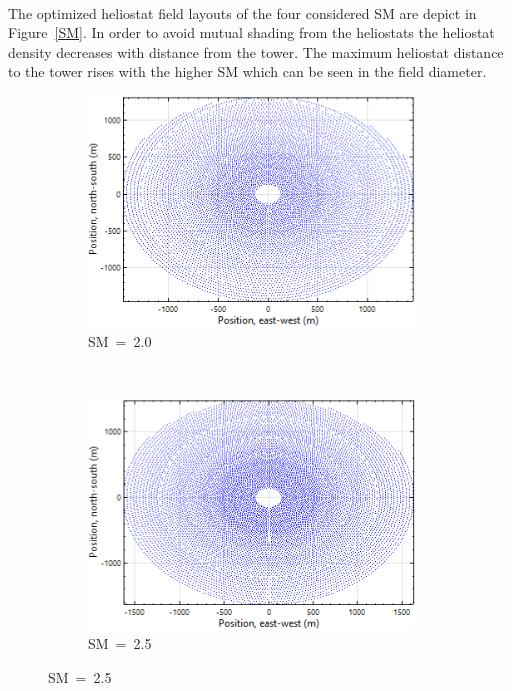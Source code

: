 \documentclass[Master,MEE,english]{twbook}%
\begin{document}
\\
The optimized heliostat field layouts of the four considered SM are depict in Figure~\ref{SM}. In order to avoid mutual shading from the heliostats the heliostat density decreases with distance from the tower. The maximum heliostat distance to the tower rises with the higher SM which can be seen in the field diameter. 
\begin{figure}[!htbp]
        \centering   
        \begin{subfigure}[b]{0.5\textwidth}
                \centering
                \includegraphics[width=0.95\textwidth]{FIG/SM20}
                \caption{SM~=~2.0}\label{SM2.0}
        \end{subfigure}%
        ~
        \begin{subfigure}[b]{0.5\textwidth}
                \centering
                \includegraphics[width=0.95\textwidth]{FIG/SM25}
                \caption{SM~=~2.5}\label{SM2.5}
        \end{subfigure}
        

\end{figure}
\end{document}
